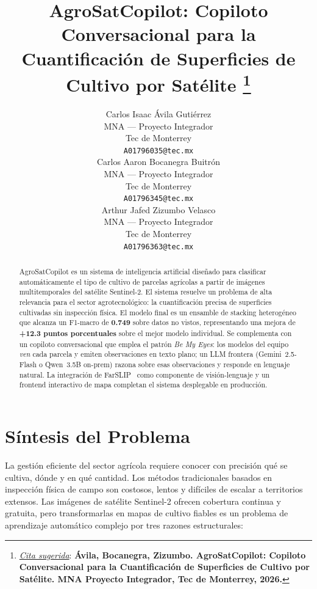 \documentclass{article}
\title{AgroSatCopilot: Copiloto Conversacional para la\\
Cuantificación de Superficies de Cultivo por Satélite
\thanks{\textit{\underline{Cita sugerida}}: \textbf{Ávila, Bocanegra,
Zizumbo. AgroSatCopilot: Copiloto Conversacional para la
Cuantificación de Superficies de Cultivo por Satélite.
MNA Proyecto Integrador, Tec de Monterrey, 2026.}}
}
\author{
  Carlos Isaac Ávila Gutiérrez \\
  MNA --- Proyecto Integrador \\
  Tec de Monterrey \\
  \texttt{A01796035@tec.mx} \\
  \And
  Carlos Aaron Bocanegra Buitrón \\
  MNA --- Proyecto Integrador \\
  Tec de Monterrey \\
  \texttt{A01796345@tec.mx} \\
  \And
  Arthur Jafed Zizumbo Velasco \\
  MNA --- Proyecto Integrador \\
  Tec de Monterrey \\
  \texttt{A01796363@tec.mx} \\
}
\begin{document}
\maketitle

\begin{abstract}
AgroSatCopilot es un sistema de inteligencia artificial diseñado para
clasificar automáticamente el tipo de cultivo de parcelas agrícolas a
partir de imágenes multitemporales del satélite Sentinel-2. El sistema
resuelve un problema de alta relevancia para el sector agrotecnológico:
la cuantificación precisa de superficies cultivadas sin inspección física.
El modelo final es un ensamble de stacking heterogéneo que alcanza un
F1-macro de \textbf{0.749} sobre datos no vistos, representando una mejora
de \textbf{+12.3 puntos porcentuales} sobre el mejor modelo individual.
Se complementa con un copiloto conversacional que emplea el patrón
\textit{Be My Eyes}: los modelos del equipo \textit{ven} cada parcela y
emiten observaciones en texto plano; un LLM frontera
(Gemini~2.5-Flash o Qwen~3.5B on-prem) razona sobre esas observaciones
y responde en lenguaje natural. La integración de
FarSLIP~\cite{li2025farslip} como componente de visión-lenguaje y un
frontend interactivo de mapa completan el sistema desplegable en
producción.
\end{abstract}


\section{Síntesis del Problema}

La gestión eficiente del sector agrícola requiere conocer con precisión
qué se cultiva, dónde y en qué cantidad. Los métodos tradicionales basados
en inspección física de campo son costosos, lentos y difíciles de escalar
a territorios extensos. Las imágenes de satélite Sentinel-2 ofrecen
cobertura continua y gratuita, pero transformarlas en mapas de cultivo
fiables es un problema de aprendizaje automático complejo por tres razones
estructurales:
\end{document}

